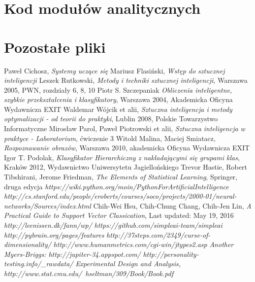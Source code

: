 \documentclass[12pt,a4paper,oneside]{report} %
\begin{document}
\section{Kod modułów analitycznych}
\section{Pozostałe pliki}

\begin{thebibliography}{9}
 Paweł Cichosz, \emph{Systemy uczące się}
 Mariusz Flasiński, \emph{Wstęp do sztucznej inteligencji}
 Leszek Rutkowski, \emph{Metody i techniki sztucznej inteligencji}, Warszawa 2005, PWN, rozdziały 6, 8, 10
 Piotr S. Szczepaniak \emph{Obliczenia inteligentne, szybkie przekształcenia i klasyfikatory}, Warszawa 2004, Akademicka Oficyna Wydawnicza EXIT
 Waldemar Wójcik et alii, \emph{Sztuczna inteligencja i metody optymalizacji - od teorii do praktyki}, Lublin 2008, Polskie Towarzystwo Informatyczne
 Mirosław Parol, Paweł Piotrowski et alii, \emph{Sztuczna inteligencja w praktyce - Laboratorium}, ćwiczenie 3
 Witold Malina, Maciej Smiatacz, \emph{Rozpoznawanie obrazów}, Warszawa 2010, akademicka Oficyna Wydawnicza EXIT
 Igor T. Podolak, \emph{Klasyfikator Hierarchiczny z nakładającymi się grupami klas}, Kraków 2012, Wydawnictwo Uniwersytetu Jagiellońskiego
 Trevor Hastie, Robert Tibshirani, Jerome Friedman, \emph{The Elements of Statistical Learning}, Springer, druga edycja
 \emph{https://wiki.python.org/moin/PythonForArtificialIntelligence}
 \emph{http://cs.stanford.edu/people/eroberts/courses/soco/projects/2000-01/neural-networks/Sources/index.html}
Chih-Wei Hsu, Chih-Chung Chang, Chih-Jen Lin, \emph{A Practical Guide to Support Vector Classication}, Last updated: May 19, 2016
 \emph{http://leenissen.dk/fann/wp/}
 \emph{https://github.com/simpleai-team/simpleai}
 \emph{http://pybrain.org/pages/features}
 \emph{http://37steps.com/2349/curse-of-dimensionality/}
 \emph{http://www.humanmetrics.com/cgi-win/jtypes2.asp}
 \emph{Another Myers-Briggs: http://jupiter-34.appspot.com/}
 \emph{http://personality-testing.info/_rawdata/}
 \emph{Experimental Design and Analysis, http://www.stat.cmu.edu/~hseltman/309/Book/Book.pdf}
\end{thebibliography}
\end{document}
